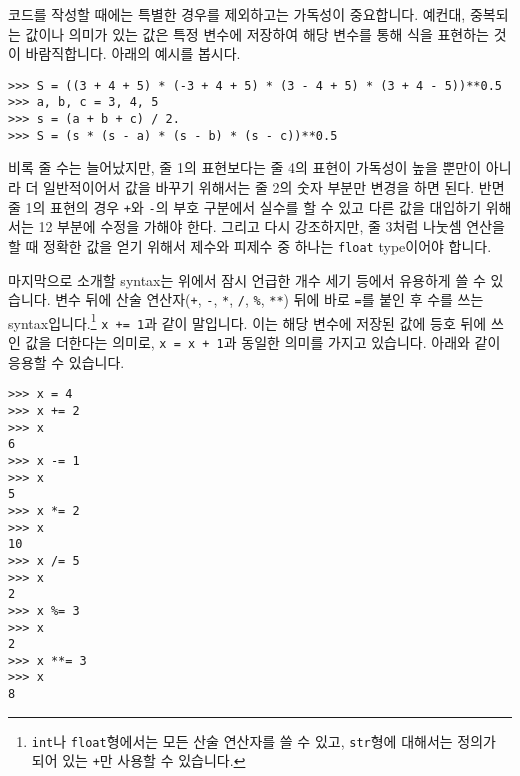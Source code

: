 \documentclass[../main.tex]{subfiles}
\begin{document}
코드를 작성할 때에는 특별한 경우를 제외하고는 가독성이 중요합니다.
예컨대, 중복되는 값이나 의미가 있는 값은 특정 변수에 저장하여 해당 변수를 통해 식을 표현하는 것이 바람직합니다.
아래의 예시를 봅시다.
\begin{verbatim}
>>> S = ((3 + 4 + 5) * (-3 + 4 + 5) * (3 - 4 + 5) * (3 + 4 - 5))**0.5
>>> a, b, c = 3, 4, 5
>>> s = (a + b + c) / 2.
>>> S = (s * (s - a) * (s - b) * (s - c))**0.5
\end{verbatim}
비록 줄 수는 늘어났지만, 줄 1의 표현보다는 줄 4의 표현이 가독성이 높을 뿐만이 아니라 더 일반적이어서 값을 바꾸기 위해서는 줄 2의 숫자 부분만 변경을 하면 된다.
반면 줄 1의 표현의 경우 \texttt{+}와 \texttt{-}의 부호 구분에서 실수를 할 수 있고 다른 값을 대입하기 위해서는 12 부분에 수정을 가해야 한다.
그리고 다시 강조하지만, 줄 3처럼 나눗셈 연산을 할 때 정확한 값을 얻기 위해서 제수와 피제수 중 하나는 \texttt{float} type이어야 합니다.

마지막으로 소개할 syntax는 위에서 잠시 언급한 개수 세기 등에서 유용하게 쓸 수 있습니다.
변수 뒤에 산술 연산자(\texttt{+}, \texttt{-}, \texttt{*}, \texttt{/}, \texttt{\%}, \texttt{**}) 뒤에 바로 \texttt{=}를 붙인 후 수를 쓰는 syntax입니다.\footnote{\texttt{int}나 \texttt{float}형에서는 모든 산술 연산자를 쓸 수 있고, \texttt{str}형에 대해서는 정의가 되어 있는 \texttt{+}만 사용할 수 있습니다.}
\texttt{x += 1}과 같이 말입니다.
이는 해당 변수에 저장된 값에 등호 뒤에 쓰인 값을 더한다는 의미로, \texttt{x = x + 1}과 동일한 의미를 가지고 있습니다.
아래와 같이 응용할 수 있습니다.
\begin{verbatim}
>>> x = 4
>>> x += 2
>>> x
6
>>> x -= 1
>>> x
5
>>> x *= 2
>>> x
10
>>> x /= 5
>>> x
2
>>> x %= 3
>>> x
2
>>> x **= 3
>>> x
8
\end{verbatim}
\end{document}
